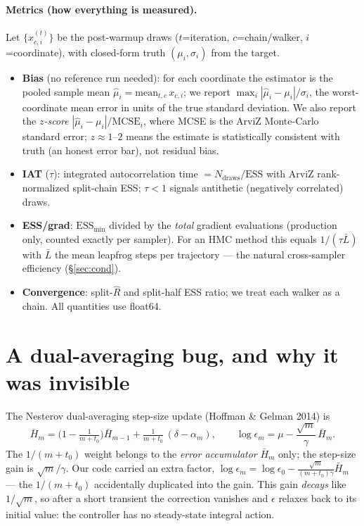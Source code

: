 \documentclass[11pt]{article}
\begin{document}
\paragraph{Metrics (how everything is measured).}
Let $\{x^{(t)}_{c,i}\}$ be the post-warmup draws ($t$=iteration, $c$=chain/walker,
$i$=coordinate), with closed-form truth $(\mu_i,\sigma_i)$ from the target.
\begin{itemize}\setlength\itemsep{1pt}
\item \textbf{Bias} (no reference run needed): for each coordinate the
estimator is the pooled sample mean $\hat\mu_i=\text{mean}_{t,c}\,x_{c,i}$; we
report $\max_i |\hat\mu_i-\mu_i|/\sigma_i$, the worst-coordinate mean error in
units of the true standard deviation. We also report the \emph{$z$-score}
$|\hat\mu_i-\mu_i|/\text{MCSE}_i$, where MCSE is the ArviZ Monte-Carlo
standard error; $z\!\approx\!1$--$2$ means the estimate is statistically
consistent with truth (an honest error bar), not residual bias.
\item \textbf{IAT} ($\tau$): integrated autocorrelation time
$=N_{\text{draws}}/\text{ESS}$ with ArviZ rank-normalized split-chain ESS;
$\tau\!<\!1$ signals antithetic (negatively correlated) draws.
\item \textbf{ESS/grad}: $\text{ESS}_{\min}$ divided by the \emph{total}
gradient evaluations (production only, counted exactly per sampler). For an
HMC method this equals $1/(\tau\bar L)$ with $\bar L$ the mean leapfrog steps
per trajectory --- the natural cross-sampler efficiency (\S\ref{sec:cond}).
\item \textbf{Convergence}: split-$\hat R$ and split-half ESS ratio; we treat
each walker as a chain. All quantities use float64.
\end{itemize}

\section{A dual-averaging bug, and why it was invisible}
\label{sec:bug}

The Nesterov dual-averaging step-size update (Hoffman \& Gelman 2014) is
\[
  \bar H_m = \Big(1-\tfrac{1}{m+t_0}\Big)\bar H_{m-1}
            + \tfrac{1}{m+t_0}\,(\delta-\alpha_m),
  \qquad
  \log\epsilon_m = \mu - \frac{\sqrt m}{\gamma}\,\bar H_m .
\]
The $1/(m{+}t_0)$ weight belongs to the \emph{error accumulator} $\bar H_m$
only; the step-size gain is $\sqrt m/\gamma$. Our code carried an extra factor,
$\log\epsilon_m=\log\epsilon_0-\frac{\sqrt m}{(m+t_0)\gamma}\bar H_m$ --- the
$1/(m{+}t_0)$ accidentally duplicated into the gain. This gain \emph{decays}
like $1/\sqrt m$, so after a short transient the correction vanishes and
$\epsilon$ relaxes back to its initial value: the controller has no
steady-state integral action.
\end{document}
